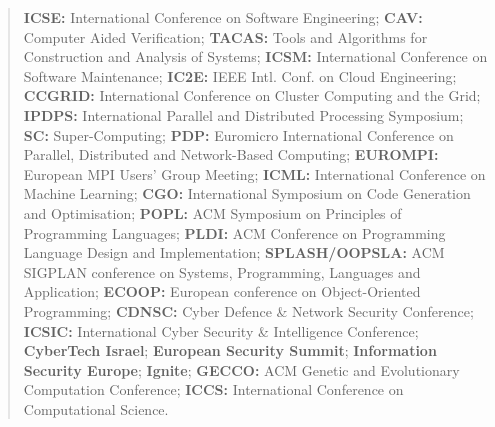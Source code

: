 \documentclass[a4paper,11pt]{article}
\begin{document}
\begin{quote}
\textbf{ICSE:} International Conference on Software Engineering;
\textbf{CAV:} Computer Aided Verification;
\textbf{TACAS:} Tools and Algorithms for Construction and Analysis of Systems;
\textbf{ICSM:} International Conference on Software Maintenance;
\textbf{IC2E:} IEEE Intl. Conf. on Cloud Engineering;
\textbf{CCGRID:} International Conference on Cluster Computing and the Grid;
\textbf{IPDPS:} International Parallel and Distributed Processing Symposium;
\textbf{SC:} Super-Computing;
\textbf{PDP:} Euromicro International Conference on Parallel, Distributed and Network-Based Computing;
\textbf{EUROMPI:} European MPI Users' Group Meeting;
\textbf{ICML:} International Conference on Machine Learning;
\textbf{CGO:} International Symposium on Code Generation and Optimisation;
\textbf{POPL:} ACM Symposium on Principles of Programming Languages;
\textbf{PLDI:} ACM Conference on Programming Language
    Design and  Implementation;
\textbf{SPLASH/OOPSLA:} ACM SIGPLAN conference on Systems, Programming, Languages and Application;
\textbf{ECOOP:} European conference on Object-Oriented Programming;
\textbf{CDNSC:} Cyber Defence \& Network Security Conference;
\textbf{ICSIC:} International Cyber Security \& Intelligence Conference;
\textbf{CyberTech Israel};
\textbf{European Security Summit};
\textbf{Information Security Europe};
\textbf{Ignite};
\textbf{GECCO:} ACM Genetic and Evolutionary Computation Conference;
\textbf{ICCS:} International Conference on Computational Science.
 \end{quote}
\end{document}
